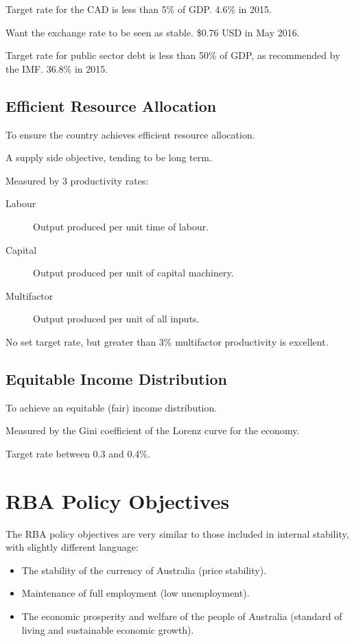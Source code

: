 \documentclass[a4paper,11pt]{report}
\begin{document}
Target rate for the CAD is less than 5\% of GDP. 4.6\% in 2015.

Want the exchange rate to be seen as stable. \$0.76 USD in May 2016.

Target rate for public sector debt is less than 50\% of GDP, as recommended by
the IMF. 36.8\% in 2015.

\subsection{Efficient Resource Allocation}

To ensure the country achieves efficient resource allocation.

A supply side objective, tending to be long term.

Measured by 3 productivity rates:

\begin{description}
\item [Labour] Output produced per unit time of labour.
\item [Capital] Output produced per unit of capital machinery.
\item [Multifactor] Output produced per unit of all inputs.
\end{description}

No set target rate, but greater than 3\% multifactor productivity is excellent.

\subsection{Equitable Income Distribution}

To achieve an equitable (fair) income distribution.

Measured by the Gini coefficient of the Lorenz curve for the economy.

Target rate between 0.3 and 0.4\%.


\section{RBA Policy Objectives}

The RBA policy objectives are very similar to those included in internal
stability, with slightly different language:

\begin{itemize}
\item The stability of the currency of Australia (price stability).
\item Maintenance of full employment (low unemployment).
\item The economic prosperity and welfare of the people of Australia (standard
	of living and sustainable economic growth).
\end{itemize}
\end{document}
